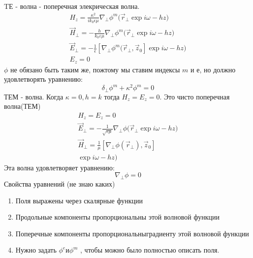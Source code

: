 TЕ - волна - поперечная элекрическая волна.
\begin{gather}
%
H_z = \frac{\kappa^2}{i k_0 \epsilon \mu} \nabla_\perp \phi^m(\vec{r}_{\perp} \exp{i\omega - h z)}\\
%
\vec{H}_\perp = - \frac{h}{k_0 \varepsilon \mu} \nabla_\perp \phi^m(\vec{r}_{\perp} \exp{i\omega - h z)} \\
%
\vec{E}_\perp = - \frac{1}{\epsilon} [\nabla_\perp \phi^m(\vec{r}_{\perp}, \vec{z}_0] \exp{i\omega - h z)}\\
E_z = 0
%
\end{gather}
$\phi$ не обязано быть таким же, пожтому мы ставим индексы $m$ и $е$, но должно удовлетворять уравнению:
\begin{equation}
	\delta_\perp \phi^m + \kappa^2 \phi^m = 0
\end{equation}
ТЕМ - волна.
Когда $\kappa = 0, h = k$ тогда $H_z = E_z = 0$. Это чисто поперечная волна(ТЕМ)
\begin{gather}
	H_z = E_z = 0\\
	\vec{E}_\perp = - \frac{1}{\sqrt{\varepsilon \mu}} \nabla_\perp \phi(\vec{r}_\perp \exp{i\omega - h z)} \\
	\vec{H}_\perp = \frac{1}{\mu} [\nabla_\perp \phi(\vec{r}_\perp), \vec{z}_0] \\\exp{i\omega - h z)}
\end{gather}
Эта волна удовлетворяет уравнению:
\begin{equation}
	\nabla_\perp \phi = 0
\end{equation}
Свойства уравнений (не знаю каких)
\begin{enumerate}
	\item Поля выражены через скалярные функции
	\item Продольные компоненты пропорциональны этой волновой функции
	\item Поперечные компоненты пропорциональныградиенту этой волновой функции
	\item  Нужно задать $\phi^e и \phi^m$ , чтобы можно было полностью описать поля.
\end{enumerate}
